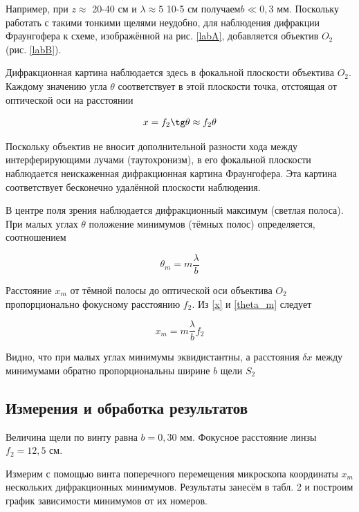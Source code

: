 \documentclass[a4paper,12pt]{article} %
\begin{document}
Например, при $ z \approx $ 20-40 см и $  \lambda \approx 5  $ 10-5  см получаем$  b \ll 0,3 $ мм. Поскольку работать с такими тонкими щелями неудобно, для наблюдения дифракции Фраунгофера к схеме, изображённой на рис. \ref{labA}, добавляется объектив $ O_2  $ (рис. \ref{labB}).

Дифракционная картина наблюдается здесь в фокальной плоскости
объектива $ O_2 $. Каждому значению угла $ \theta $ соответствует в этой плоскости точка, отстоящая от оптической оси на расстоянии

\begin{equation}\label{x}
x = f_2 \tg \theta \approx f_2 \theta
\end{equation}

Поскольку объектив не вносит дополнительной разности хода
между интерферирующими лучами (таутохронизм), в его фокальной
плоскости наблюдается неискаженная дифракционная картина Фраунгофера. Эта картина соответствует бесконечно удалённой плоскости
наблюдения.

В центре поля зрения наблюдается дифракционный максимум (светлая полоса). При малых углах $ \theta $ положение минимумов (тёмных полос)
определяется, соотношением

\begin{equation}\label{theta_m}
\theta_m = m \dfrac{\lambda}{b}
\end{equation}

Расстояние $ x_m $ от тёмной полосы до оптической оси объектива $ O_2 $ пропорционально фокусному расстоянию $ f_2 $. Из \eqref{x} и \eqref{theta_m} следует 

\begin{equation}\label{xm}
x_m = m \dfrac{\lambda}{b} f_2
\end{equation}

Видно, что при малых углах минимумы эквидистантны, а расстояния $ \delta x $ между минимумами обратно пропорциональны ширине $ b $ щели $ S_2 $

\subsection{Измерения и обработка результатов}

Величина щели по винту равна $ b = 0,30 $ мм. Фокусное расстояние линзы $ f_2 = 12,5 $ см.

Измерим с помощью винта поперечного перемещения микроскопа координаты $ x_m $ нескольких дифракционных минимумов.
Результаты занесём в табл. 2 и построим график зависимости минимумов от их номеров. 
\end{document}
